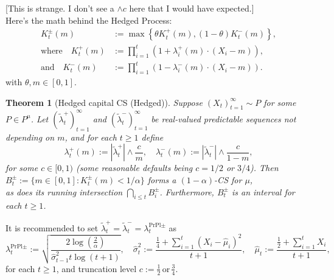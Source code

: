 \documentclass{article}
\newtheorem{theorem}{Theorem}
\newcommand{\art}[1]{\begingroup\color{blue}#1\endgroup}
\newcommand{\aadit}[1]{\begingroup\color{orange}#1\endgroup}
\renewcommand{\leq}{\leqslant}
\renewcommand{\geq}{\geqslant}
\begin{document}
\art{[This is strange. I don't see a $\wedge c$ here that I would have expected.]}
\\
\aadit{Here's the math behind the Hedged Process:
\begin{equation} \label{eq:24}
\begin{aligned}
    K^\pm_t (m) &:= \max \left\{ \theta K^+_t (m), (1 - \theta) K^-_t (m) \right\}, \\
    \text{where} \quad K^+_t (m) &:= \prod_{i=1}^{t} \left( 1 + \lambda^+_i (m) \cdot (X_i - m) \right), \\
    \text{and} \quad K^-_t (m) &:= \prod_{i=1}^{t} \left( 1 - \lambda^-_i (m) \cdot (X_i - m) \right).
\end{aligned}
\end{equation}
with \( \theta, m \in [0,1] \).
\setcounter{theorem}{1}
\begin{theorem}[Hedged capital CS (Hedged)]  
Suppose \( (X_t)_{t=1}^{\infty} \sim P \) for some \( P \in P^{\mu} \). Let \( (\tilde{\lambda}^+_t)_{t=1}^{\infty} \) and \( (\tilde{\lambda}^-_t)_{t=1}^{\infty} \) be real-valued predictable sequences not depending on \( m \), and for each \( t \geq 1 \) define  
\begin{equation}  
\lambda^+_t (m) := |\tilde{\lambda}^+_t| \wedge \frac{c}{m}, \quad  
\lambda^-_t (m) := |\tilde{\lambda}^-_t| \wedge \frac{c}{1 - m},  
\end{equation}  
for some \( c \in [0,1) \) (some reasonable defaults being \( c = 1/2 \) or \( 3/4 \)). Then\\

$ B^\pm_t := \{ m \in [0,1] : K^\pm_t (m) < 1/\alpha \} $ forms a \( (1 - \alpha) \)-CS for \( \mu \), \\

as does its running intersection \( \bigcap_{i \leq t} B^\pm_i \). Furthermore, \( B^\pm_t \) is an interval for each \( t \geq 1 \).  
\end{theorem}  
It is recommended to set \( \tilde{\lambda}^+_t = \tilde{\lambda}^-_t = \lambda^{\text{PrPl}\pm}_t \) as
\begin{equation} \label{eq:26}
   \lambda^{\text{PrPl}\pm}_t := \sqrt{\frac{2 \log (\frac{2}{\alpha})}{\hat{\sigma}^2_{t-1}t \log (t + 1)}}, \quad \hat{\sigma}^2_t := \frac{\frac{1}{4} + \sum_{i=1}^{t} (X_i - \hat{\mu}_i)^2}{t + 1}, \quad \hat{\mu}_t := \frac{\frac{1}{2}+ \sum_{i=1}^{t} X_i}{t + 1},
\end{equation}
for each \( t \geq 1 \), and truncation level \( c := \frac{1}{2} \, \text{or} \, \frac{3}{4}
 \). \\
 
}
\end{document}
